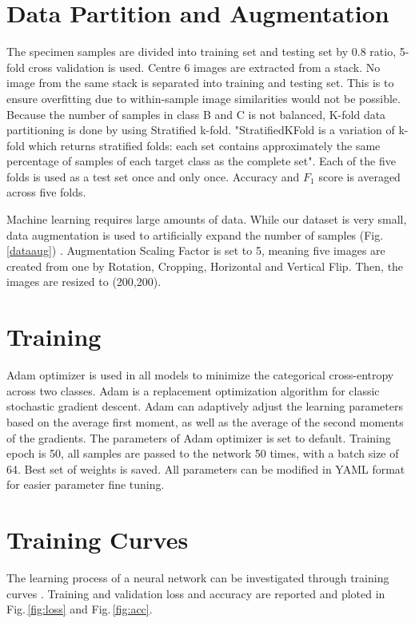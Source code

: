 \section{Data Partition and Augmentation}
The specimen samples are divided into training set and testing set by 0.8 ratio, 5-fold cross validation is used. Centre 6 images are extracted from a stack. No image from the same stack is separated into training and testing set. This is to ensure overfitting due to within-sample image similarities would not be possible. Because the number of samples in class B and C is not balanced, K-fold data partitioning is done by using Stratified k-fold. "StratifiedKFold is a variation of k-fold which returns stratified folds: each set contains approximately the same percentage of samples of each target class as the complete set". Each of the five folds is used as a test set once and only once. Accuracy and $F_1$ score is averaged across five folds.

Machine learning requires large amounts of data. While our dataset is very small, data augmentation is used to artificially expand the number of samples (Fig.\,\ref{dataaug}) . Augmentation Scaling Factor is set to 5, meaning five images are created from one by Rotation, Cropping, Horizontal and Vertical Flip. Then, the images are resized to (200,200).

\section{Training}
Adam \citep{adam} optimizer is used in all models to minimize the categorical cross-entropy across two classes. Adam is a replacement optimization algorithm for classic stochastic gradient descent. Adam can adaptively adjust the learning parameters based on the average first moment, as well as the average of the second moments of the gradients. The parameters of Adam optimizer is set to default. Training epoch is 50, all samples are passed to the network 50 times, with a batch size of 64. Best set of weights is saved. All parameters can be modified in YAML format for easier parameter fine tuning.


\section{Training Curves}
The learning process of a neural network can be investigated through training curves \citep{Anzanello2011}. Training and validation loss and accuracy are reported and ploted in Fig.\,\ref{fig:loss} and Fig.\,\ref{fig:acc}.


